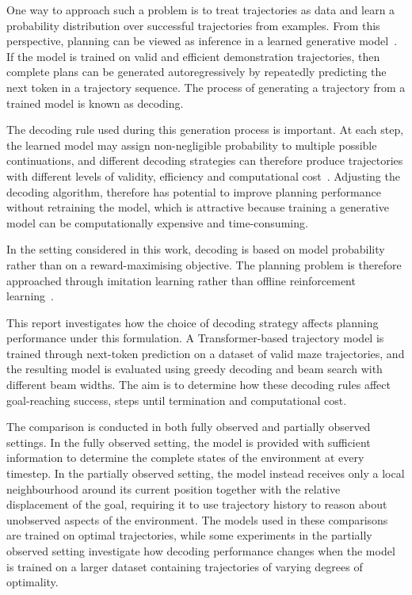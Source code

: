 ﻿\documentclass[12pt,a4paper]{article}
\let\oldcite\cite
\renewcommand{\cite}[1]{\mbox{\oldcite{#1}}}
\theoremstyle{definition}
\begin{document}
One way to approach such a problem is to treat trajectories as data and learn a probability
distribution over successful trajectories from examples. From this perspective, planning can be
viewed as inference in a learned generative model~\cite{janner2021trajectory}. If the model is trained on valid and efficient
demonstration trajectories, then complete plans can be generated autoregressively by repeatedly
predicting the next token in a trajectory sequence. The process of generating a trajectory from a trained model is known as decoding.

The decoding rule used during this generation process is important. At each step, the learned model
may assign non-negligible probability to multiple possible continuations, and different decoding
strategies can therefore produce trajectories with different levels of validity, efficiency and
computational cost~\cite{jurafsky2026speech,janner2021trajectory}. Adjusting the decoding algorithm,
therefore has potential to improve planning performance without retraining the model, which 
is attractive because training a generative model can be computationally expensive and time-consuming.

In the setting considered in
this work, decoding is based on model probability rather than on a reward-maximising objective.
The planning problem is therefore approached through imitation learning rather than offline reinforcement
learning~\cite{janner2021trajectory}. 

This report investigates how the choice of decoding strategy affects planning performance under this
formulation. A Transformer-based trajectory model is trained through next-token prediction on a
dataset of valid maze trajectories, and the resulting model is evaluated using greedy decoding and
beam search with different beam widths. The aim is to determine how these decoding rules affect
goal-reaching success, steps until termination and computational cost. 

The comparison is conducted in
both fully observed and partially observed settings. In the fully observed setting, the model
is provided with sufficient information to determine the complete states of the environment
at every timestep. In the partially observed setting, the model instead receives only a 
local neighbourhood around its current position together with the relative displacement of 
the goal, requiring it to use trajectory history to reason about unobserved aspects of the 
environment.
The models used in these comparisons are trained on optimal trajectories, while some 
experiments in the partially observed setting investigate how decoding performance changes 
when the model is trained on a larger dataset containing trajectories of varying degrees of 
optimality.
\end{document}
